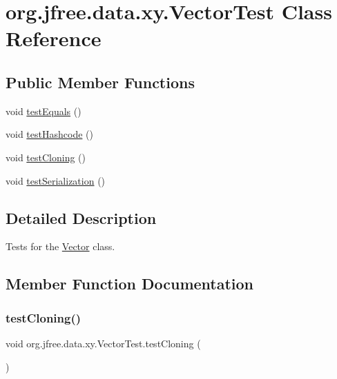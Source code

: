 \hypertarget{classorg_1_1jfree_1_1data_1_1xy_1_1_vector_test}{}\section{org.\+jfree.\+data.\+xy.\+Vector\+Test Class Reference}
\label{classorg_1_1jfree_1_1data_1_1xy_1_1_vector_test}
\subsection*{Public Member Functions}
\begin{DoxyCompactItemize}
\item 
void \mbox{\hyperlink{classorg_1_1jfree_1_1data_1_1xy_1_1_vector_test_a749d84af2c87b3497d71aa1bc279bfc0}{test\+Equals}} ()
\item 
void \mbox{\hyperlink{classorg_1_1jfree_1_1data_1_1xy_1_1_vector_test_a47cf63e297eb603305a1fbecbb9a645a}{test\+Hashcode}} ()
\item 
void \mbox{\hyperlink{classorg_1_1jfree_1_1data_1_1xy_1_1_vector_test_aa112ced91c75a72b6c2323b359b54c90}{test\+Cloning}} ()
\item 
void \mbox{\hyperlink{classorg_1_1jfree_1_1data_1_1xy_1_1_vector_test_aa3b8f3aa783266c2c239196d1703d72a}{test\+Serialization}} ()
\end{DoxyCompactItemize}


\subsection{Detailed Description}
Tests for the \mbox{\hyperlink{classorg_1_1jfree_1_1data_1_1xy_1_1_vector}{Vector}} class. 

\subsection{Member Function Documentation}
\mbox{\label{classorg_1_1jfree_1_1data_1_1xy_1_1_vector_test_aa112ced91c75a72b6c2323b359b54c90}} 
\subsubsection{\texorpdfstring{test\+Cloning()}{testCloning()}}
{\footnotesize\ttfamily void org.\+jfree.\+data.\+xy.\+Vector\+Test.\+test\+Cloning (\begin{DoxyParamCaption}{ }\end{DoxyParamCaption})}

